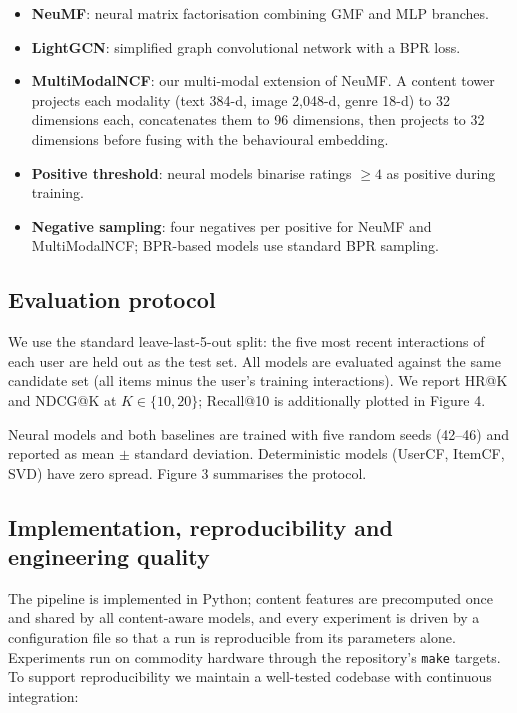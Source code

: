 \documentclass[11pt,a4paper]{article}
\begin{document}
\begin{itemize}[leftmargin=1.6em,itemsep=1pt,topsep=3pt]
  \item \textbf{NeuMF}: neural matrix factorisation combining GMF and MLP
        branches.
  \item \textbf{LightGCN}: simplified graph convolutional network with a BPR
        loss.
  \item \textbf{MultiModalNCF}: our multi-modal extension of NeuMF. A content
        tower projects each modality (text 384-d, image 2,048-d, genre 18-d) to
        32 dimensions each, concatenates them to 96 dimensions, then projects to
        32 dimensions before fusing with the behavioural embedding.
  \item \textbf{Positive threshold}: neural models binarise ratings $\geq4$ as
        positive during training.
  \item \textbf{Negative sampling}: four negatives per positive for NeuMF and
        MultiModalNCF; BPR-based models use standard BPR sampling.
\end{itemize}

\subsection{Evaluation protocol}
We use the standard leave-last-5-out split: the five most recent interactions of
each user are held out as the test set. All models are evaluated against the
same candidate set (all items minus the user's training interactions). We report
HR@K and NDCG@K at $K\in\{10,20\}$; Recall@10 is additionally plotted in
Figure 4.

Neural models and both baselines are trained with five random seeds (42--46) and
reported as mean $\pm$ standard deviation. Deterministic models (UserCF, ItemCF,
SVD) have zero spread. Figure 3 summarises the protocol.

\subsection{Implementation, reproducibility and engineering quality}
The pipeline is implemented in Python; content features are precomputed once and
shared by all content-aware models, and every experiment is driven by a
configuration file so that a run is reproducible from its parameters alone.
Experiments run on commodity hardware through the repository's \texttt{make}
targets. To support reproducibility we maintain a well-tested codebase with
continuous integration:
\end{document}

